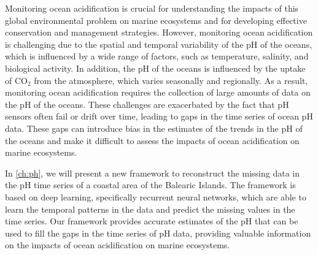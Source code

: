 Monitoring ocean acidification is crucial for understanding the impacts of
this global environmental problem on marine ecosystems and for developing
effective conservation and management strategies. However, monitoring ocean
acidification is challenging due to the spatial and temporal variability of
the pH of the oceans, which is influenced by a wide range of factors, such as
temperature, salinity, and biological activity. In addition, the pH of the
oceans is influenced by the uptake of CO$_2$ from the atmosphere, which
varies seasonally and regionally. As a result, monitoring ocean acidification
requires the collection of large amounts of data on the pH of the oceans.
These challenges are exacerbated by the fact that pH sensors often fail or
drift over time, leading to gaps in the time series of ocean pH data. These
gaps can introduce bias in the estimates of the trends in the pH of the oceans
and make it difficult to assess the impacts of ocean acidification on marine
ecosystems.

In \cref{ch:ph}, we will present a new framework to reconstruct the missing
data in the pH time series of a coastal area of the Balearic Islands.
The framework is based on deep learning, specifically recurrent neural
networks, which are able to learn the temporal patterns in the data and predict
the missing values in the time series. Our framework provides accurate
estimates of the pH that can be used to fill the gaps in the time series of pH
data, providing valuable information on the impacts of ocean acidification on
marine ecosystems.